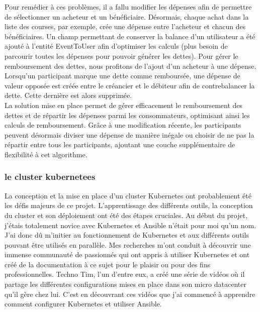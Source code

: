 Pour remédier à ces problèmes, il a fallu modifier les dépenses afin de permettre de sélectionner un acheteur et un bénéficiaire.
Désormais, chaque achat dans la liste des courses, par exemple, crée une dépense entre l'acheteur et chacun des bénéficiaires.
Un champ permettant de conserver la balance d'un utilisateur a été ajouté à l'entité EventToUser afin d'optimiser les calculs (plus besoin de parcourir toutes les dépenses pour pouvoir générer les dettes).
Pour gérer le remboursement des dettes, nous profitons de l'ajout d'un acheteur à une dépense.
Lorsqu'un participant marque une dette comme remboursée, une dépense de valeur opposée est créée entre le créancier et le débiteur afin de contrebalancer la dette.
Cette dernière est alors supprimée.\\

La solution mise en place permet de gérer efficacement le remboursement des dettes et de répartir les dépenses parmi les consommateurs,
optimisant ainsi les calculs de remboursement.
Grâce à une modification récente, les participants peuvent désormais diviser une dépense de manière inégale ou choisir de ne pas la répartir entre tous les participants,
ajoutant une couche supplémentaire de flexibilité à cet algorithme.\\

\subsubsection{le cluster kubernetees}
La conception et la mise en place d'un cluster Kubernetes ont probablement été les défis majeurs de ce projet.
L'apprentissage des différents outils, la conception du cluster et son déploiement ont été des étapes cruciales.
Au début du projet, j'étais totalement novice avec Kubernetes et Ansible n'était pour moi qu'un nom.\\

J'ai donc dû m'initier au fonctionnement de Kubernetes et aux différents outils pouvant être utilisés en parallèle.
Mes recherches m'ont conduit à découvrir une immense communauté de passionnés qui ont appris à utiliser Kubernetes
et ont créé de la documentation à ce sujet pour le plaisir ou pour des fins professionnelles.
Techno Tim, l'un d'entre eux, a créé une série de vidéos où il partage les différentes configurations mises en place
dans son micro datacenter qu'il gère chez lui.
C'est en découvrant ces vidéos que j'ai commencé à apprendre comment configurer Kubernetes et utiliser Ansible.\\

